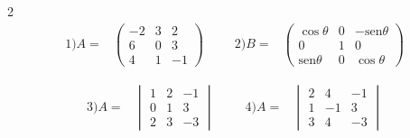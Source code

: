 \documentclass[
]{article}
\begin{document}
\begin{multicols}{2}
\begin{equation*}
\begin{array}{ccccc}
1) A=& 
  \begin{pmatrix} 
    -2       & 3      & 2           \\ 
     6       & 0      & 3           \\
     4       & 1      & -1     
  \end{pmatrix}
 & \,\,\,\,\, &
2) B=&  \begin{pmatrix} 
     \cos\theta       & 0      & -\mbox{sen}\theta    \\ 
       0              & 1      & 0           \\
    \mbox{sen}\theta  & 0      & \cos\theta     
  \end{pmatrix}
\end{array}
\end{equation*}

\begin{equation*}
\begin{array}{ccccc}
3) A=& 
  \begin{vmatrix} 
     1       & 2      & -1           \\ 
     0       & 1      & 3           \\
     2       & 3      & -3     
  \end{vmatrix}
 & \,\,\,\,\, &
4) A=&  \begin{vmatrix} 
     2       & 4      & -1           \\ 
     1       & -1     & 3           \\
     3       & 4      & -3   
  \end{vmatrix}
\end{array}
\end{equation*}
\end{multicols}
\end{document}
